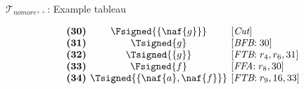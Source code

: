 \begin{frame}{$\mathcal{T}_{\textit{nomore}^{++}}$: Example tableau}
\begin{center}
\begin{minipage}[t]{16cm}
\begin{minipage}[t]{6cm}
\begin{minipage}[t]{2cm}
\[\begin{array}{l@{~~}c@{~~}l}
\textbf{(30)}                                      &
  \Fsigned{\{\naf{g}\}}                     &
  [\textit{Cut}]                                   \\
\textbf{(31)}                                      &
  \Tsigned{g}                                      &
  [\textit{BFB}{:}\;\text{30}]                     \\
\textbf{(32)}                                      &
  \Tsigned{\{g\}}                                  &
  [\textit{FTB}{:}\;r_4, r_6, \text{31}]           \\
\textbf{(33)}                                      &
  \Fsigned{f}                                      &
  [\textit{FFA}{:}\;r_8, \text{30}]                \\
\textbf{(34)}                                      & \hspace{-0.1cm}
  \Tsigned{\{\naf{a},\naf{f}\}}      \hspace{-0.1cm} &
  [\textit{FTB}{:}\;r_9, \text{16}, \text{33}]
\end{array}
\]
\end{minipage}
\end{minipage}
\end{minipage}
\end{center}
\end{frame}
